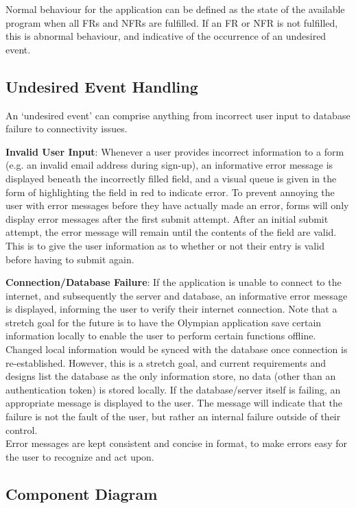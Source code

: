 \documentclass[12pt, titlepage]{article}
\begin{document}
	Normal behaviour for the application can be defined as the state of the available program when all FRs and NFRs are fulfilled. If an FR or NFR is not fulfilled, this is abnormal behaviour, and indicative of the occurrence of an undesired event.
	
	\subsection{Undesired Event Handling}
	
	An `undesired event' can comprise anything from incorrect user input to database failure to connectivity issues. 
	
	\textbf{Invalid User Input}: Whenever a user provides incorrect information to a form (e.g. an invalid email address during sign-up), an informative error message is displayed beneath the incorrectly filled field, and a visual queue is given in the form of highlighting the field in red to indicate error. To prevent annoying the user with error messages before they have actually made an error, forms will only display error messages after the first submit attempt. After an initial submit attempt, the error message will remain until the contents of the field are valid. This is to give the user information as to whether or not their entry is valid before having to submit again.
	
	\textbf{Connection/Database Failure}: If the application is unable to connect to the internet, and subsequently the server and database, an informative error message is displayed, informing the user to verify their internet connection. Note that a stretch goal for the future is to have the Olympian application save certain information locally to enable the user to perform certain functions offline. Changed local information would be synced with the database once connection is re-established. However, this is a stretch goal, and current requirements and designs list the database as the only information store, no data (other than an authentication token) is stored locally. If the database/server itself is failing, an appropriate message is displayed to the user. The message will indicate that the failure is not the fault of the user, but rather an internal failure outside of their control.
	\\
	
	Error messages are kept consistent and concise in format, to make errors easy for the user to recognize and act upon.
  
	\subsection{Component Diagram}
	
\end{document}
